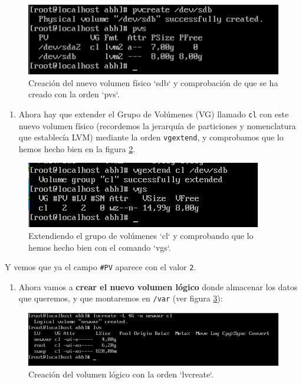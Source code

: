 \documentclass[
]{memoir}
\providecommand{\tightlist}{%
  \setlength{\itemsep}{0pt}\setlength{\parskip}{0pt}}
\begin{document}
\begin{figure}

{\centering \includegraphics[width=0.7\linewidth]{images/d} 

}

\caption{Creación del nuevo volumen físico `sdb` y comprobación de que se ha creado con la orden `pvs`.}\label{fig:d}
\end{figure}

\begin{enumerate}
\def\labelenumi{\arabic{enumi}.}
\setcounter{enumi}{4}
\tightlist
\item
  Ahora hay que extender el Grupo de Volúmenes (VG) llamado \texttt{cl} con este nuevo volumen físico (recordemos la jerarquía de particiones y nomenclatura que establecía LVM) mediante la orden \texttt{vgextend}, y comprobamos que lo hemos hecho bien en la figura \ref{fig:e}.
\end{enumerate}

\begin{figure}

{\centering \includegraphics[width=0.7\linewidth]{images/e} 

}

\caption{Extendiendo el grupo de volúmenes `cl` y comprobando que lo hemos hecho bien con el comando `vgs`.}\label{fig:e}
\end{figure}

Y vemos que ya el campo \texttt{\#PV} aparece con el valor \texttt{2}.

\begin{enumerate}
\def\labelenumi{\arabic{enumi}.}
\setcounter{enumi}{5}
\tightlist
\item
  Ahora vamos a \textbf{crear el nuevo volumen lógico} donde almacenar los datos que queremos, y que montaremos en \texttt{/var} (ver figura \ref{fig:f}):
\end{enumerate}

\begin{figure}

{\centering \includegraphics[width=0.9\linewidth]{images/f} 

}

\caption{Creación del volumen lógico con la orden `lvcreate`.}\label{fig:f}
\end{figure}
\end{document}
